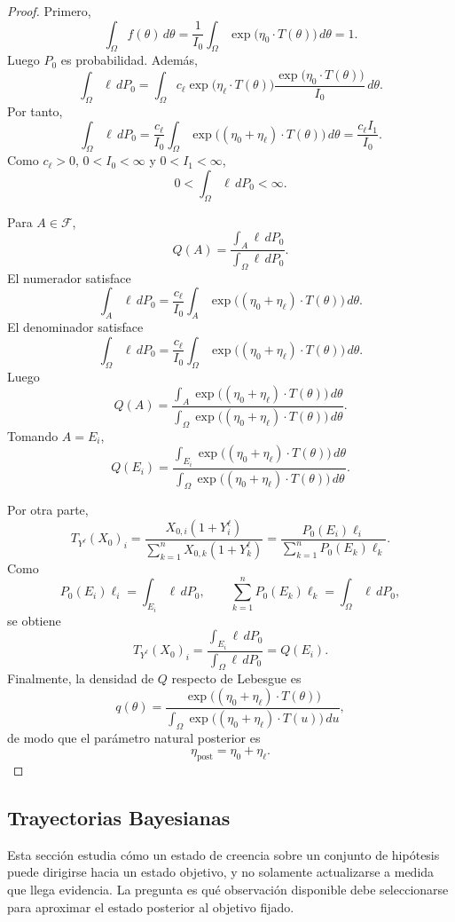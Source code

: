 \documentclass[12pt]{article}
\begin{document}
\begin{proof}
Primero,
\[
\int_\Omega f(\theta)\,d\theta
=
\frac{1}{I_0}\int_\Omega \exp\bigl(\eta_0\cdot T(\theta)\bigr)\,d\theta
=
1.
\]
Luego $P_0$ es probabilidad. Además,
\[
\int_\Omega\ell\,dP_0
=
\int_\Omega c_\ell\exp\bigl(\eta_\ell\cdot T(\theta)\bigr)
\frac{\exp\bigl(\eta_0\cdot T(\theta)\bigr)}{I_0}\,d\theta.
\]
Por tanto,
\[
\int_\Omega\ell\,dP_0
=
\frac{c_\ell}{I_0}
\int_\Omega\exp\bigl((\eta_0+\eta_\ell)\cdot T(\theta)\bigr)\,d\theta
=
\frac{c_\ell I_1}{I_0}.
\]
Como $c_\ell>0$, $0<I_0<\infty$ y $0<I_1<\infty$,
\[
0<\int_\Omega\ell\,dP_0<\infty.
\]

Para $A\in\mathcal F$,
\[
Q(A)
=
\frac{\displaystyle\int_A\ell\,dP_0}{\displaystyle\int_\Omega\ell\,dP_0}.
\]
El numerador satisface
\[
\int_A\ell\,dP_0
=
\frac{c_\ell}{I_0}
\int_A\exp\bigl((\eta_0+\eta_\ell)\cdot T(\theta)\bigr)\,d\theta.
\]
El denominador satisface
\[
\int_\Omega\ell\,dP_0
=
\frac{c_\ell}{I_0}
\int_\Omega\exp\bigl((\eta_0+\eta_\ell)\cdot T(\theta)\bigr)\,d\theta.
\]
Luego
\[
Q(A)
=
\frac{\displaystyle\int_A\exp\bigl((\eta_0+\eta_\ell)\cdot T(\theta)\bigr)\,d\theta}{\displaystyle\int_\Omega\exp\bigl((\eta_0+\eta_\ell)\cdot T(\theta)\bigr)\,d\theta}.
\]
Tomando $A=E_i$,
\[
Q(E_i)
=
\frac{\displaystyle\int_{E_i}\exp\bigl((\eta_0+\eta_\ell)\cdot T(\theta)\bigr)\,d\theta}{\displaystyle\int_\Omega\exp\bigl((\eta_0+\eta_\ell)\cdot T(\theta)\bigr)\,d\theta}.
\]

Por otra parte,
\[
T_{Y^\ell}(X_0)_i
=
\frac{X_{0,i}(1+Y_i^\ell)}{\displaystyle\sum_{k=1}^nX_{0,k}(1+Y_k^\ell)}
=
\frac{P_0(E_i)\ell_i}{\displaystyle\sum_{k=1}^nP_0(E_k)\ell_k}.
\]
Como
\[
P_0(E_i)\ell_i=\int_{E_i}\ell\,dP_0,
\qquad
\sum_{k=1}^nP_0(E_k)\ell_k=\int_\Omega\ell\,dP_0,
\]
se obtiene
\[
T_{Y^\ell}(X_0)_i
=
\frac{\displaystyle\int_{E_i}\ell\,dP_0}{\displaystyle\int_\Omega\ell\,dP_0}
=Q(E_i).
\]
Finalmente, la densidad de $Q$ respecto de Lebesgue es
\[
q(\theta)
=
\frac{\exp\bigl((\eta_0+\eta_\ell)\cdot T(\theta)\bigr)}{\displaystyle\int_\Omega\exp\bigl((\eta_0+\eta_\ell)\cdot T(u)\bigr)\,du},
\]
de modo que el parámetro natural posterior es
\[
\eta_{\mathrm{post}}=\eta_0+\eta_\ell.
\]
\end{proof}


\subsection{Trayectorias Bayesianas}

Esta sección estudia cómo un estado de creencia sobre un conjunto de hipótesis puede dirigirse hacia un estado objetivo, y no solamente actualizarse a medida que llega evidencia. La pregunta es qué observación disponible debe seleccionarse para aproximar el estado posterior al objetivo fijado.
\end{document}
